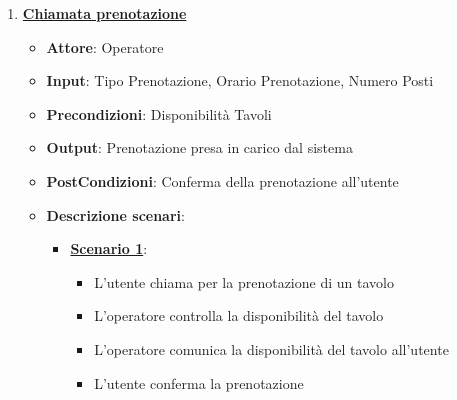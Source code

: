 \begin{enumerate}
\begin{itemize}
\begin{itemize}
\begin{itemize}
                \item L'operatore comunica l'impossibilit\`a di evadere l'ordine richiesto al cliente
            \end{itemize}
            \item \uline{Scenario 3}:
            \begin{itemize}
                \item Il cliente effettua un ordine all'operatore
                \item L'operatore inserisce nel sistema pietanze, bevande e numero tavolo
                \item Una o pi\`u pietanze non \`e presente nel database
                \item L'operatore segnala l'errore del database al sistema centrale
                \item L'operatore comunica l'impossibilit\`a di evadere l'ordine richiesto al cliente
            \end{itemize}
        \end{itemize}
    \end{itemize}
    \item \uline {{\bf Chiamata prenotazione}}
    \begin{itemize}
        \item {\bf Attore}: Operatore
        \item {\bf Input}: Tipo Prenotazione, Orario Prenotazione, Numero Posti
        \item {\bf Precondizioni}: Disponibilit\`a Tavoli
        \item {\bf Output}: Prenotazione presa in carico dal sistema
        \item {\bf PostCondizioni}: Conferma della prenotazione all'utente
        \item {\bf Descrizione scenari}:
        \begin{itemize}
            \item \uline{{\bf Scenario 1}}:
            \begin{itemize}
                \item L'utente chiama per la prenotazione di un tavolo
                \item L'operatore controlla la disponibilit\`a del tavolo
                \item L'operatore comunica la disponibilit\`a del tavolo all'utente
                \item L'utente conferma la prenotazione
            \end{itemize}

\end{itemize}
\end{itemize}
\end{enumerate}
